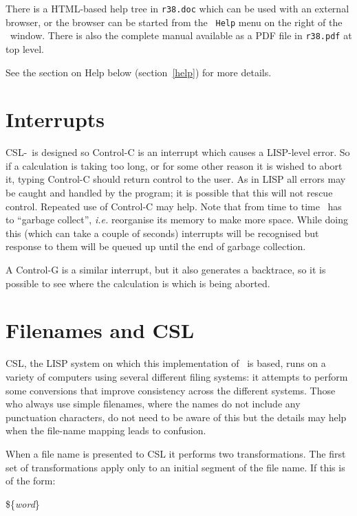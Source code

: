 There is a HTML-based help tree in {\tt r38.doc} which can be used
with an external browser, or the browser can be started from the {\tt
  Help} menu on the right of the \REDUCE\ window.  There is also the
complete manual available as a PDF file in {\tt r38.pdf} at top level.

See the section on Help below (section~\ref{help}) for more details.

\section{Interrupts}
\label{Interrupts}

CSL-\REDUCE\ is designed so Control-C is an interrupt which causes a
LISP-level error.  So if a calculation is taking too long, or for some
other reason it is wished to abort it, typing Control-C should return
control to the user.  As in LISP all errors may be caught and handled
by the program; it is possible that this will not rescue control.
Repeated use of Control-C may help.  Note that from time to
time \REDUCE\ has to ``garbage collect'',  {\em i.e.\/} reorganise its memory to
make more space.  While doing this (which can take a couple of
seconds) interrupts will be recognised but response to them will be
queued up until the end of garbage collection.

A Control-G is a similar interrupt, but it also generates a backtrace,
so it is possible to see where the calculation is which is being
aborted.


\section{Filenames and CSL}

CSL, the LISP system on which this implementation of \REDUCE\ is based,
runs on a variety of computers using several different filing systems:
it attempts to perform some conversions that improve consistency
across the different systems.  Those who always use simple filenames,
where the names do not include any punctuation characters, do not need
to be aware of this but the details may help when the file-name
mapping leads to confusion.

When a file name is presented to CSL it performs two transformations.
The first set of transformations apply only to an initial segment of
the file name.  If this is of the form:

\begin{center} \$\{{\em word}\} \end{center}

